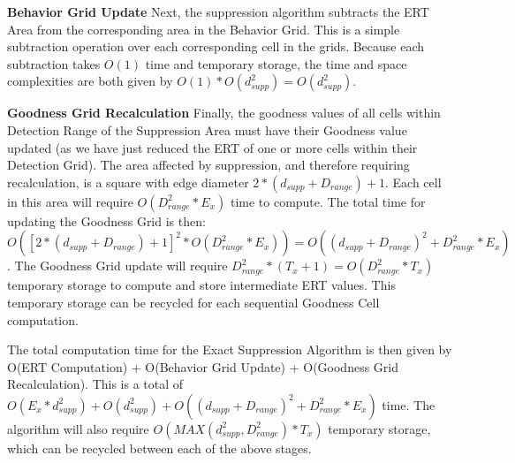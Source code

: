 \textbf{Behavior Grid Update}\newline
Next, the suppression algorithm subtracts the ERT Area from the corresponding area in the Behavior Grid.  This is a simple subtraction operation over each corresponding cell in the grids.  Because each subtraction takes $O(1)$ time and temporary storage, the time and space complexities are both given by $O(1) * O(d_{supp}^2) = O(d_{supp}^2)$.

\textbf{Goodness Grid Recalculation}\newline
Finally, the goodness values of all cells within Detection Range of the Suppression Area must have their Goodness value updated (as we have just reduced the ERT of one or more cells within their Detection Grid).  The area affected by suppression, and therefore requiring recalculation, is a square with edge diameter $2 * (d_{supp} + D_{range}) + 1$.  Each cell in this area will require  $O(D_{range}^2 * E_x)$ time to compute.  The total time for updating the Goodness Grid is then: $O([2 * (d_{supp} + D_{range}) + 1]^2 * O(D_{range}^2 * E_x)) = O((d_{supp} + D_{range})^2 + D_{range}^2 * E_x)$.  The Goodness Grid update will require $D_{range}^2 * (T_x + 1) = O(D_{range}^2 * T_x)$ temporary storage to compute and store intermediate ERT values.  This temporary storage can be recycled for each sequential Goodness Cell computation.


The total computation time for the Exact Suppression Algorithm is then given by O(ERT Computation) + O(Behavior Grid Update) + O(Goodness Grid Recalculation). This is a total of $O(E_{x} * d_{supp}^2) + O(d_{supp}^2) + O((d_{supp} + D_{range})^2 + D_{range}^2 * E_x)$ time.  The algorithm will also require $O(MAX(d_{supp}^2 , D_{range}^2) * T_x)$ temporary storage, which can be recycled between each of the above stages.


